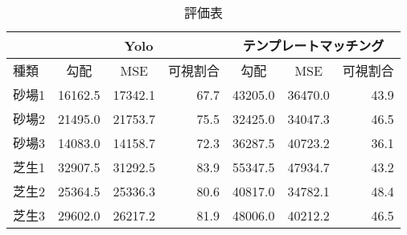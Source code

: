 \documentclass[11pt,a4j]{jreport}
\begin{document}
\begin{table}[htbp]
    \centering
    \label{tab:customTable}
    \caption{評価表}
    \begin{tabular}{|l|r|r|r|r|r|r|}
        \hline
        \multicolumn{1}{|c|}{} & \multicolumn{3}{c|}{Yolo} & \multicolumn{3}{c|}{テンプレートマッチング}                                                                                                                  \\ \hline
        種類                     & \multicolumn{1}{|c|}{勾配}  & \multicolumn{1}{|c|}{MSE}        & \multicolumn{1}{|c|}{可視割合} & \multicolumn{1}{|c|}{勾配} & \multicolumn{1}{|c|}{MSE} & \multicolumn{1}{|c|}{可視割合} \\ \hline
        砂場1                    & 16162.5                   & 17342.1                          & 67.7                       & 43205.0                  & 36470.0                   & 43.9                       \\
        砂場2                    & 21495.0                   & 21753.7                          & 75.5                       & 32425.0                  & 34047.3                   & 46.5                       \\
        砂場3                    & 14083.0                   & 14158.7                          & 72.3                       & 36287.5                  & 40723.2                   & 36.1                       \\
        芝生1                    & 32907.5                   & 31292.5                          & 83.9                       & 55347.5                  & 47934.7                   & 43.2                       \\
        芝生2                    & 25364.5                   & 25336.3                          & 80.6                       & 40817.0                  & 34782.1                   & 48.4                       \\
        芝生3                    & 29602.0                   & 26217.2                          & 81.9                       & 48006.0                  & 40212.2                   & 46.5                       \\ \hline
    \end{tabular}
\end{table}
\end{document}
